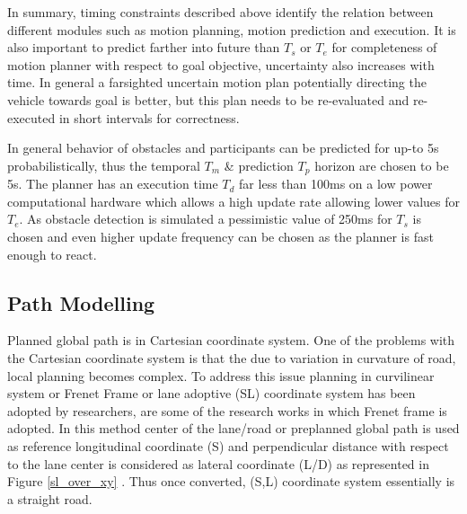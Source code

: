 In summary, timing constraints described above identify the relation between different modules such as motion planning, motion prediction and execution. It is also important to predict farther into future than $T_s$ or $T_e$ for completeness of motion planner with respect to goal objective, uncertainty also increases with time. In general a farsighted uncertain motion plan potentially directing the vehicle towards goal is better, but this plan needs to be re-evaluated and re-executed in short intervals for correctness. 

In general behavior of obstacles and participants can be predicted for up-to 5s probabilistically, thus the temporal $ T_m $ \& prediction $ T_p $ horizon are chosen to be 5s. The planner has an execution time $ T_d $ far less than 100ms on a low power computational hardware which allows a high update rate allowing lower values for $ T_e $. As obstacle detection is simulated a pessimistic value of 250ms for $ T_s $ is chosen and even higher update frequency can be chosen as the planner is fast enough to react. 


\subsection{Path Modelling} \label{frenet_frame}

 Planned global path is in Cartesian coordinate system. One of the problems with the Cartesian coordinate system is that the due to variation in curvature of road, local planning becomes complex. To address this issue planning in curvilinear system or Frenet Frame or  lane adoptive (SL) coordinate system has been adopted by researchers, \cite{traj_planner_optimization} \cite{spatio_temporal_state_lattice} \cite{diss_shui_phd_thesis} \cite{real_time_traj_plan_article} \cite{volvo_reactive_traj} \cite{curvilinear_System_Automated_Drv} are some of the research works in which Frenet frame is adopted. In this method center of the lane/road or preplanned global path is used as reference longitudinal coordinate (S) and perpendicular distance with respect to the lane center is considered as lateral coordinate (L/D) as represented in Figure \ref{sl_over_xy} \cite{diss_shui_phd_thesis}.  Thus once converted, (S,L) coordinate system essentially is a straight road.
 
